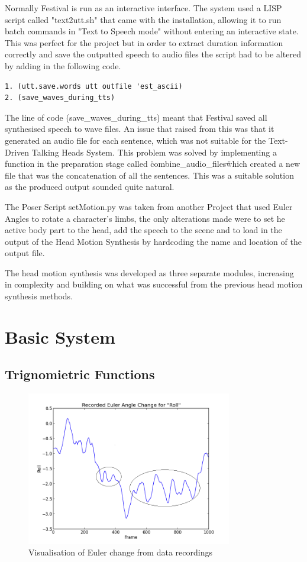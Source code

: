 \documentclass[bsc,frontabs,twoside,singlespacing,parskip]{infthesis}
\begin{document}
Normally Festival is run as an interactive interface. The system used a LISP script called "text2utt.sh" that came with the installation, allowing it to run batch commands in "Text to Speech mode" without entering an interactive state. This was perfect for the project but in order to extract duration information correctly and save the outputted speech to audio files the script had to be altered by adding in the following code. 

\begin{lstlisting}
1. (utt.save.words utt outfile 'est_ascii) 
2. (save_waves_during_tts)
\end{lstlisting}

The line of code (save\_waves\_during\_tts) meant that Festival saved all synthesised speech to wave files. An issue that raised from this was that it generated an audio file for each sentence, which was not suitable for the Text-Driven Talking Heads System. This problem was solved by implementing a function in the preparation stage called \"combine\_audio\_files\" which created a new file that was the concatenation of all the sentences. This was a suitable solution as the produced output sounded quite natural.

The Poser Script setMotion.py was taken from another Project that used Euler Angles to rotate a character's limbs, the only alterations made were to set he active body part to the head, add the speech to the scene and to load in the output of the Head Motion Synthesis by hardcoding the name and location of the output file.

The head motion synthesis was developed as three separate modules, increasing in complexity and building on what was successful from the previous head motion synthesis methods.

\section{Basic System} 

\subsection{Trignomietric Functions}

\begin{figure}
	\centering
	\includegraphics[width=0.8\textwidth]{euler_change.png}
	\caption{Visualisation of Euler change from data recordings}
\end{figure}
\end{document}
